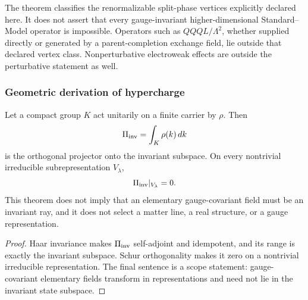 \documentclass[12pt,a4paper]{article}
\begin{document}
\begin{remark}
\label{p5:rem:higher-dimensional-proton-decay-nonminimal}
The theorem classifies the renormalizable split-phase vertices explicitly
declared here.  It does not assert that every gauge-invariant
higher-dimensional Standard--Model operator is impossible.  Operators such
as \(QQQL/\Lambda^2\), whether supplied directly or generated by a
parent-completion exchange field, lie outside that declared vertex class.
Nonperturbative electroweak effects are outside the perturbative statement as
well.
\end{remark}

\subsubsection{Geometric derivation of hypercharge}
\label{p5:sec:part1-hypercharge}

\begin{theorem}
\label{p5:thm:primitive-local-ray-singlet-criterion}
Let a compact group \(K\) act unitarily on a finite carrier by \(\rho\).
Then
\begin{equation}
\label{p5:eq:local-ray-invariant-projector}
\Pi_{\rm inv}= \int_K \rho(k)\,dk
\end{equation}
is the orthogonal projector onto the invariant subspace.  On every nontrivial
irreducible subrepresentation \(V_\lambda\),
\begin{equation}
\label{p5:eq:local-ray-projection-kills-nonsinglet}
\Pi_{\rm inv}|_{V_\lambda}=0 .
\end{equation}
This theorem does not imply that an elementary gauge-covariant field must be
an invariant ray, and it does not select a matter line, a real structure, or a
gauge representation.
\end{theorem}

\begin{proof}
Haar invariance makes \(\Pi_{\rm inv}\) self-adjoint and idempotent, and its
range is exactly the invariant subspace.  Schur orthogonality makes it zero
on a nontrivial irreducible representation.  The final sentence is a scope
statement: gauge-covariant elementary fields transform in representations and
need not lie in the invariant state subspace.
\end{proof}
\end{document}
